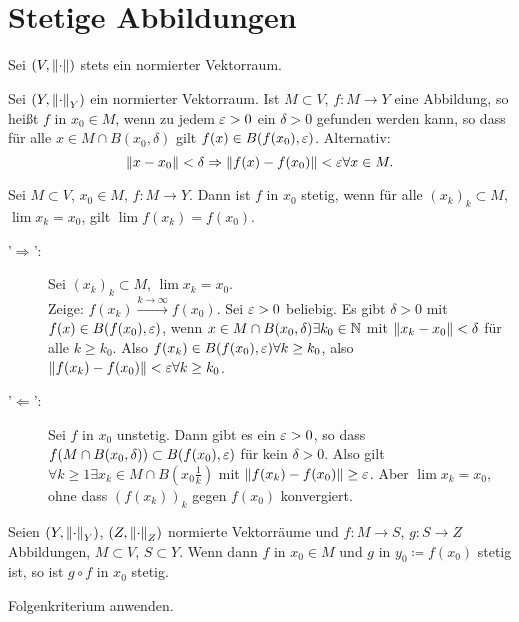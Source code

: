 \section{Stetige Abbildungen}
\changesection
Sei $ (V,\left\|\cdot\right\|) $ stets ein normierter Vektorraum.
\begin{definition}
	Sei $ (Y,\left\|\cdot\right\|_Y) $ ein normierter Vektorraum. Ist $ M\subset V $, $ f\colon M\rightarrow Y $ eine Abbildung, so hei\ss t $ f $  in $ x_0\in M $, wenn zu jedem $ \varepsilon>0 $ ein $ \delta>0 $ gefunden werden kann, so dass f\"ur alle $ x\in M\cap B(x_0,\delta) $ gilt $ f(x)\in B(f(x_0),\varepsilon) $. Alternativ: \[ \left\|x-x_0\right\|<\delta\Rightarrow\left\|f(x)-f(x_0)\right\|<\varepsilon\forall x\in M. \] 
\end{definition}
\begin{satz}
	Sei $ M\subset V $, $ x_0\in M $, $ f\colon M\rightarrow Y $. Dann ist $ f $ in $ x_0 $ stetig, wenn f\"ur alle $ (x_k)_k\subset M $, $ \lim x_k=x_0 $, gilt $ \lim f(x_k)=f(x_0) $.
\end{satz}
\begin{beweis}
	\begin{description}
		\item['$ \Rightarrow $':] Sei $ (x_k)_k\subset M $, $ \lim x_k=x_0 $.\\
		Zeige: $ f(x_k)\xrightarrow{k\to\infty}f(x_0) $. Sei $ \varepsilon>0 $ beliebig. Es gibt $ \delta>0 $ mit $ f(x)\in B(f(x_0),\varepsilon) $, wenn $ x\in M\cap B(x_0,\delta) \exists k_0\in\mathbb{N}$ mit $ \left\|x_k-x_0\right\|<\delta $ f\"ur alle $ k\geq k_0 $. Also $ f(x_k)\in B(f(x_0),\varepsilon)\forall k\geq k_0 $, also $ \left\|f(x_k)-f(x_0)\right\|<\varepsilon\forall k\geq k_0 $.
		\item['$ \Leftarrow $':] Sei $ f $ in $ x_0 $ unstetig. Dann gibt es ein $ \varepsilon>0 $, so dass $ f(M\cap B(x_0,\delta))\subset B(f(x_0),\varepsilon) $ f\"ur kein $ \delta>0 $. Also gilt $ \forall k\geq 1\exists x_k\in M\cap B\left(x_0\frac{1}{k}\right) $ mit $ \left\|f(x_k)-f(x_0)\right\|\geq\varepsilon $. Aber $ \lim x_k=x_0 $, ohne dass $ (f(x_k))_k $ gegen $ f(x_0) $ konvergiert.
	\end{description}
\end{beweis}
\begin{lemma}
	Seien $ (Y,\left\|\cdot\right\|_Y) $, $ (Z,\left\|\cdot\right\|_Z) $ normierte Vektorr\"aume und $ f\colon M\rightarrow S $, $ g\colon S\rightarrow Z $ Abbildungen, $ M\subset V $, $ S\subset Y $. Wenn dann $ f$ in $ x_0\in M $ und $ g $ in $ y_0\coloneqq f(x_0) $ stetig ist, so ist $ g\circ f $ in $ x_0 $ stetig.
\end{lemma}
\begin{lemma}
	Folgenkriterium anwenden.
\end{lemma}
